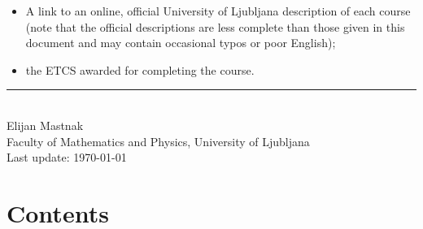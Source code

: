\documentclass[11pt, a4paper]{article}
\begin{document}
\begin{center}
\begin{minipage}[t]{0.90\textwidth}
\begin{itemize}
        \item A link to an online, official University of Ljubljana description of each course
        (note that the official descriptions are less complete than those given in this document and may contain occasional typos or poor English);

        \item the ETCS awarded for completing the course.

    \end{itemize}
\end{minipage}

\vfill

\rule{0.45\linewidth}{0.4pt}\\
Elijan Mastnak\\
Faculty of Mathematics and Physics, University of Ljubljana\\
Last update: \today

\end{center}
\newpage

\section*{Contents}
\pagestyle{empty}
\end{document}
